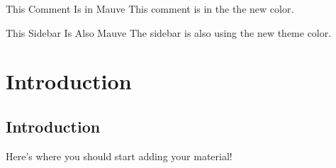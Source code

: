 \begingroup
\DndSetThemeColor[PhbMauve]

\begin{DndComment}{This Comment Is in Mauve}
  This comment is in the the new color.
\end{DndComment}

\begin{DndSidebar}{This Sidebar Is Also Mauve}
  The sidebar is also using the new theme color.
\end{DndSidebar}
\endgroup

\part{Introduction}

\chapter{Introduction}
\label{ch:intro}

Here's where you should start adding your material!